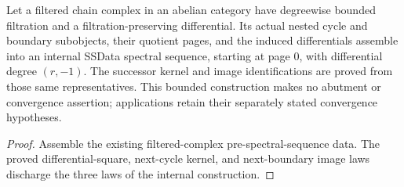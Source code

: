

\begin{theorem}
  \label{thm:filtered-complex-to-spectral-sequence}
  \leanok
  Let a filtered chain complex in an abelian category have degreewise bounded
  filtration and a filtration-preserving differential. Its actual nested
  cycle and boundary subobjects, their quotient pages, and the induced
  differentials assemble into an internal SSData spectral sequence, starting
  at page $0$, with differential degree $(r,-1)$. The successor kernel and
  image identifications are proved from those same representatives.
  This bounded construction makes no abutment or convergence assertion;
  applications retain their separately stated convergence hypotheses.
\end{theorem}
\begin{proof}
  Assemble the existing filtered-complex pre-spectral-sequence data.
  The proved differential-square, next-cycle kernel, and next-boundary
  image laws discharge the three laws of the internal construction.
  \leanok
\end{proof}
